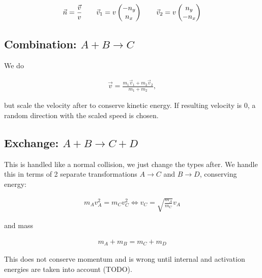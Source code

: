 \documentclass{article}
\begin{document}
	\begin{align*}
		\vec{n} = \frac{\vec{v}}{v} \hspace{20px} \vec{v}_1 = v\begin{pmatrix} -n_y\\ n_x\end{pmatrix} \hspace{20px} \vec{v}_2 = v\begin{pmatrix} n_y\\ -n_x\end{pmatrix}
	\end{align*}
	
	\subsection{Combination: $A + B \rightarrow C$}
	We do
	
	\begin{align*}
		\vec{v} = \frac{m_1 \vec{v}_1 + m_2 \vec{v}_2}{m_1 + m_2},
	\end{align*}

	but scale the velocity after to conserve kinetic energy. If resulting velocity is 0, a random direction with the scaled speed is chosen. 
    
	\subsection{Exchange: $A + B \rightarrow C + D$}
	This is handled like a normal collision, we just change the types after. We handle this in terms of 2 separate transformations $A \rightarrow C$ and $B \rightarrow D$, conserving energy:
	
	\begin{align*}
		m_A v_A^2 = m_C v_C^2 \Leftrightarrow v_C = \sqrt{\frac{m_A}{m_C}}v_A
	\end{align*}

	and mass
	
	\begin{align*}
		m_A + m_B = m_C + m_D
	\end{align*}
	
	This does not conserve momentum and is wrong until internal and activation energies are taken into account (TODO).
\end{document}
